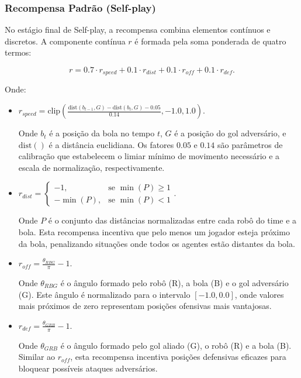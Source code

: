 \subsubsection{Recompensa Padrão (Self-play)}

No estágio final de Self-play, a recompensa combina elementos contínuos e discretos. A componente contínua $r$ é formada pela soma ponderada de quatro termos:

$$r = 0.7 \cdot r_{speed} + 0.1 \cdot r_{dist} + 0.1 \cdot r_{off} + 0.1 \cdot r_{def}.$$

Onde:

\begin{itemize}
    \item $r_{speed} = \text{clip}\left(\frac{\text{dist}(b_{t-1}, G) - \text{dist}(b_t, G) - 0.05}{0.14}, -1.0, 1.0\right).$
    
    Onde $b_t$ é a posição da bola no tempo $t$, $G$ é a posição do gol adversário, e $\text{dist}()$ é a distância euclidiana. Os fatores $0.05$ e $0.14$ são parâmetros de calibração que estabelecem o limiar mínimo de movimento necessário e a escala de normalização, respectivamente.
    
    \item $r_{dist} = 
    \begin{cases}
      -1, & \text{se } \min(P) \geq 1 \\
      -\min(P), & \text{se } \min(P) < 1
    \end{cases}.$
    
    Onde $P$ é o conjunto das distâncias normalizadas entre cada robô do time e a bola. Esta recompensa incentiva que pelo menos um jogador esteja próximo da bola, penalizando situações onde todos os agentes estão distantes da bola.
    
    \item $r_{off} = \frac{\theta_{RBG}}{\pi} - 1.$
    
    Onde $\theta_{RBG}$ é o ângulo formado pelo robô (R), a bola (B) e o gol adversário (G). Este ângulo é normalizado para o intervalo $[-1.0, 0.0]$, onde valores mais próximos de zero representam posições ofensivas mais vantajosas.
    
    \item $r_{def} = \frac{\theta_{GRB}}{\pi} - 1.$
    
    Onde $\theta_{GRB}$ é o ângulo formado pelo gol aliado (G), o robô (R) e a bola (B). Similar ao $r_{off}$, esta recompensa incentiva posições defensivas eficazes para bloquear possíveis ataques adversários.
\end{itemize}

